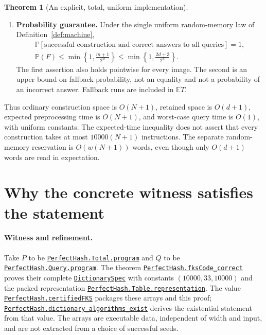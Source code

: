 \documentclass[11pt,a4paper]{article}
\theoremstyle{definition}
\newtheorem{theorem}{Theorem}
\newcommand{\E}{\mathbb E}
\newcommand{\Prb}{\mathbb P}
\newcommand{\code}[1]{\nolinkurl{#1}}
\newcommand{\src}[3]{\href{https://github.com/ilyaraz/verified_algorithms/blob/f67e943886482e132334af0f922f24dd58bb4cdc/#1\#L#2}{#3}}
\begin{document}
\begin{theorem}[An explicit, total, uniform implementation]
\begin{enumerate}[label=\textup{(\roman*)}]
\item \textbf{Probability guarantee.}
Under the single uniform random-memory law of Definition~\ref{def:machine},
\begin{gather*}
 \boxed{\Prb[\text{successful construction and correct answers to all queries}]=1,}\\
 \Prb(F)\le\min\!\left\{1,\frac{m+1}{2^w}\right\}
 \le\min\!\left\{1,\frac{2d+3}{2^w}\right\}.
\end{gather*}
The first assertion also holds pointwise for every image. The second is
an upper bound on fallback probability, not an equality and not a probability
of an incorrect answer. Fallback runs are included in $\E T$.
\end{enumerate}
\end{theorem}

Thus ordinary construction space is $O(N+1)$, retained space is $O(d+1)$,
expected preprocessing time is $O(N+1)$, and worst-case query time is $O(1)$,
with uniform constants. The expected-time inequality does not assert that
every construction takes at most $10000(N+1)$ instructions. The separate
random-memory reservation is $O(w(N+1))$ words, even though only $O(d+1)$
words are read in expectation.

\section{Why the concrete witness satisfies the statement}

\paragraph{Witness and refinement.}
Take $P$ to be \src{DataStructures/PerfectHash/Total/Program.lean}{19}{\code{PerfectHash.Total.program}} and
$Q$ to be \src{DataStructures/PerfectHash/Query/Program.lean}{70}{\code{PerfectHash.Query.program}}. The theorem
\src{DataStructures/PerfectHash/Certified.lean}{10}{\code{PerfectHash.fksCode_correct}} proves their complete
\src{DataStructures/PerfectHash/Specification.lean}{85}{\code{DictionarySpec}} with constants $(10000,33,10000)$ and the packed
representation \src{DataStructures/PerfectHash/Representation.lean}{162}{\code{PerfectHash.Table.representation}}.
The value \src{DataStructures/PerfectHash/Certified.lean}{14}{\code{PerfectHash.certifiedFKS}} packages these arrays and this
proof; \src{DataStructures/PerfectHash/Certified.lean}{21}{\code{PerfectHash.dictionary_algorithms_exist}} derives the existential
statement from that value. The arrays are executable data, independent of
width and input, and are not extracted from a choice of successful seeds.
\end{document}
